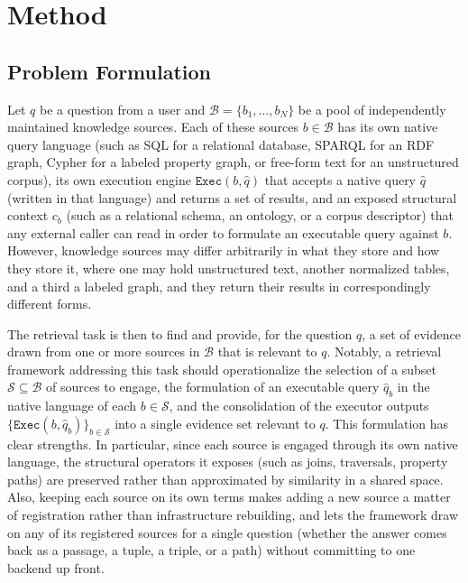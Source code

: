 \section{Method}

\subsection{Problem Formulation}

Let $q$ be a question from a user and $\mathcal{B} = \{b_1, \ldots, b_N\}$ be a pool of independently maintained knowledge sources. Each of these sources $b \in \mathcal{B}$ has its own native query language (such as SQL for a relational database, SPARQL for an RDF graph, Cypher for a labeled property graph, or free-form text for an unstructured corpus), its own execution engine $\texttt{Exec}(b, \hat{q})$ that accepts a native query $\hat{q}$ (written in that language) and returns a set of results, and an exposed structural context $c_b$ (such as a relational schema, an ontology, or a corpus descriptor) that any external caller can read in order to formulate an executable query against $b$. However, knowledge sources may differ arbitrarily in what they store and how they store it, where one may hold unstructured text, another normalized tables, and a third a labeled graph, and they return their results in correspondingly different forms.

The retrieval task is then to find and provide, for the question $q$, a set of evidence drawn from one or more sources in $\mathcal{B}$ that is relevant to $q$. Notably, a retrieval framework addressing this task should operationalize the selection of a subset $\mathcal{S} \subseteq \mathcal{B}$ of sources to engage, the formulation of an executable query $\hat{q}_b$ in the native language of each $b \in \mathcal{S}$, and the consolidation of the executor outputs $\{\texttt{Exec}(b, \hat{q}_b)\}_{b \in \mathcal{S}}$ into a single evidence set relevant to $q$. This formulation has clear strengths. In particular, since each source is engaged through its own native language, the structural operators it exposes (such as joins, traversals, property paths) are preserved rather than approximated by similarity in a shared space. Also, keeping each source on its own terms makes adding a new source a matter of registration rather than infrastructure rebuilding, and lets the framework draw on any of its registered sources for a single question (whether the answer comes back as a passage, a tuple, a triple, or a path) without committing to one backend up front.


